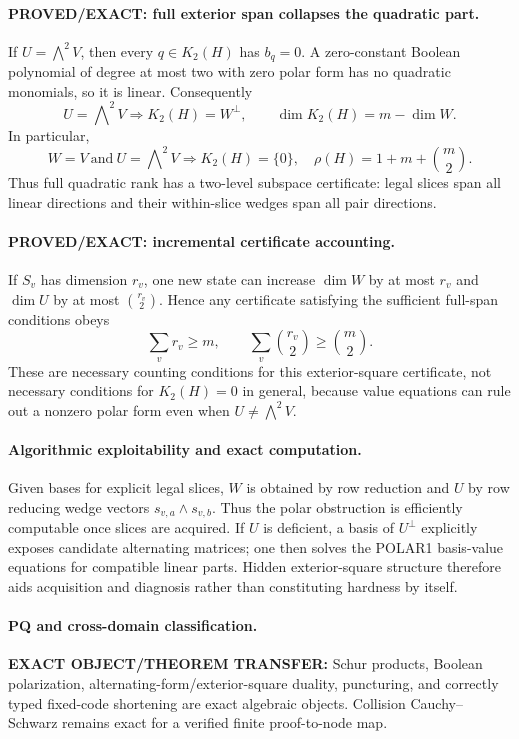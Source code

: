 \documentclass[11pt]{article}
\begin{document}
\paragraph{PROVED/EXACT: full exterior span collapses the quadratic part.}
If \(U=\bigwedge^2V\), then every \(q\in K_2(H)\) has \(b_q=0\). A zero-constant Boolean polynomial of degree at most two with zero polar form has no quadratic monomials, so it is linear. Consequently
\[
\boxed{U=\bigwedge\nolimits^2V\Longrightarrow K_2(H)=W^\perp},
\qquad
\boxed{\dim K_2(H)=m-\dim W.}
\]
In particular,
\[
\boxed{W=V\ \text{and}\ U=\bigwedge\nolimits^2V
\Longrightarrow K_2(H)=\{0\},\quad \rho(H)=1+m+\binom m2.}
\]
Thus full quadratic rank has a two-level subspace certificate: legal slices span all linear directions and their within-slice wedges span all pair directions.

\paragraph{PROVED/EXACT: incremental certificate accounting.}
If \(S_v\) has dimension \(r_v\), one new state can increase \(\dim W\) by at most \(r_v\) and \(\dim U\) by at most \(\binom{r_v}{2}\). Hence any certificate satisfying the sufficient full-span conditions obeys
\[
\sum_v r_v\ge m,\qquad
\sum_v\binom{r_v}{2}\ge\binom m2.
\]
These are necessary counting conditions for this exterior-square certificate, not necessary conditions for \(K_2(H)=0\) in general, because value equations can rule out a nonzero polar form even when \(U\ne\bigwedge^2V\).

\paragraph{Algorithmic exploitability and exact computation.}
Given bases for explicit legal slices, \(W\) is obtained by row reduction and \(U\) by row reducing wedge vectors \(s_{v,a}\wedge s_{v,b}\). Thus the polar obstruction is efficiently computable once slices are acquired. If \(U\) is deficient, a basis of \(U^\perp\) explicitly exposes candidate alternating matrices; one then solves the POLAR1 basis-value equations for compatible linear parts. Hidden exterior-square structure therefore aids acquisition and diagnosis rather than constituting hardness by itself.

\paragraph{PQ and cross-domain classification.}
\textbf{EXACT OBJECT/THEOREM TRANSFER:} Schur products, Boolean polarization, alternating-form/exterior-square duality, puncturing, and correctly typed fixed-code shortening are exact algebraic objects. Collision Cauchy--Schwarz remains exact for a verified finite proof-to-node map.
\end{document}

